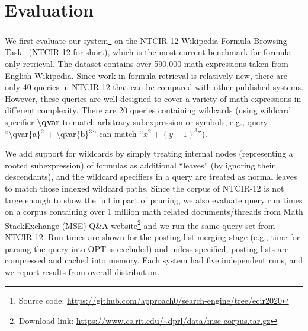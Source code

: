 \documentclass[runningheads]{llncs}
\begin{document}
\section{Evaluation}
We first evaluate our system\footnote{Source code: \url{https://github.com/approach0/search-engine/tree/ecir2020}} on the NTCIR-12 Wikipedia Formula Browsing Task~\cite{ntcir12} (NTCIR-12 for short), which is the most current benchmark for formula-only retrieval.
The dataset contains over 590,000 math expressions taken from English Wikipedia.
%
Since work in formula retrieval is relatively new, there are only 40 queries in NTCIR-12 that can be compared with other published systems. However, these queries are well designed to cover a variety of math expressions in different complexity.
There are 20 queries containing wildcards (using wildcard specifier \textbf{\textbackslash{}qvar} to match arbitrary subexpression or symbols, e.g., query ``\textbackslash qvar\{a\}$^2$ + \textbackslash qvar\{b\}$^3$'' can match ``$x^2 + (y + 1)^3$'').

We add support for wildcards by simply treating internal nodes (representing a rooted subexpression) of formulas as additional ``leaves'' (by ignoring their descendants), and the wildcard specifiers in a query are treated as normal leaves to match those indexed wildcard paths.
Since the corpus of NTCIR-12 is not large enough to show the full impact of pruning, we also evaluate query run times on a corpus containing over 1 million math related documents/threads from Math StackExchange (MSE) Q\&A website\footnote{Download link: \url{https://www.cs.rit.edu/~dprl/data/mse-corpus.tar.gz}} and we run the same query set from NTCIR-12.
%
Run times are shown for the posting list merging stage (e.g., time for parsing the query into OPT is excluded) and unless specified, posting lists are compressed and cached into memory.
%
Each system had five independent runs, and we report results from overall distribution.
\end{document}
